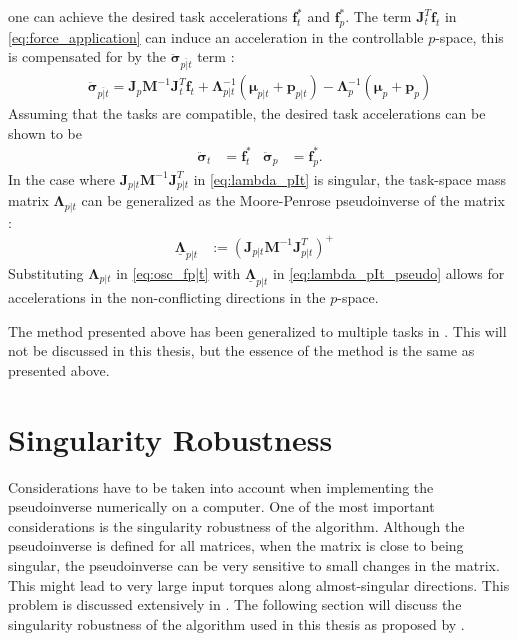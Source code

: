 one can achieve the desired task accelerations $\bm{f}_t^*$ and
$\bm{f}_p^*$. The term $\bm{J}_t^T\bm{f}_t$ in \autoref{eq:force_application} can induce an acceleration in the 
controllable $p$-space, this is compensated for by the
$\ddot{\bm{\sigma}}_{\overline{p|t}}$ term \cite{sentis2004}:
\begin{align}
    \ddot{\bm{\sigma}}_{\overline{p|t}} = \bm{J}_p \bm{M}^{-1} \bm{J}_t^T \bm{f}_t
    + \bm{\Lambda}_{p|t}^{-1}\left(\bm{\mu}_{p|t} + \bm{p}_{p|t}\right)
    - \bm{\Lambda}_{p}^{-1}\left(\bm{\mu}_p + \bm{p}_p\right)
\end{align}
Assuming that the tasks are compatible, the desired task accelerations can be
shown to be
\begin{align}
    \ddot{\bm{\sigma}}_t &= \bm{f}_t^* & \ddot{\bm{\sigma}}_p &= \bm{f}_p^*.
\end{align}
In the case where $\bm{J}_{p|t}\bm{M}^{-1}\bm{J}_{p|t}^T$ in \autoref{eq:lambda_pIt}
is singular, the task-space mass matrix $\bm{\Lambda}_{p|t}$ can be generalized
as the Moore-Penrose pseudoinverse of the matrix \cite{khatib2004}:
\begin{align}
    \underline{\bm{\Lambda}}_{p|t} &:= \left(\bm{J}_{p|t} \bm{M}^{-1} \bm{J}_{p|t}^T\right)^{+} &
    \label{eq:lambda_pIt_pseudo}
\end{align}
Substituting $\bm{\Lambda}_{p|t}$ in \autoref{eq:osc_fp|t} with
$\underline{\bm{\Lambda}}_{p|t}$ in \autoref{eq:lambda_pIt_pseudo} allows for
accelerations in the non-conflicting directions in the $p$-space.

The method presented above has been generalized to multiple tasks in \cite{sentis2004}.
This will not be discussed in this thesis, but the essence of the method is the same
as presented above.

\section{Singularity Robustness}
\label{sec:tpc:sing_robust}

Considerations have to be taken into account when implementing the
pseudoinverse numerically on a computer. One of the most important considerations is the singularity
robustness of the algorithm. Although the pseudoinverse is defined for all matrices,
when the matrix is close to being singular, the pseudoinverse can be very sensitive
to small changes in the matrix. This might lead to very large input torques along
almost-singular directions. This problem is discussed extensively in \cite{chiaverini1997}.
The following section will discuss the singularity robustness of the algorithm used in this
thesis as proposed by \cite{chiaverini1997}.

